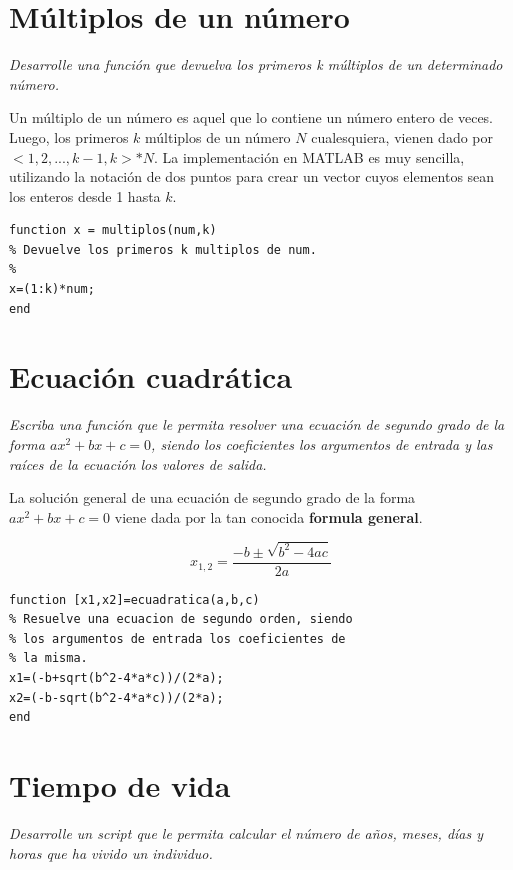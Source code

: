 \section{Múltiplos de un número}

\textit{Desarrolle una función que devuelva los primeros k múltiplos de un determinado número.}



Un múltiplo de un número es aquel que lo contiene un número entero de veces. Luego, los primeros $k$ 
múltiplos de un número $N$ cualesquiera, vienen dado por $<1,2,...,k-1,k>*N$. La implementación 
en MATLAB es muy sencilla, utilizando la notación de dos puntos para crear un vector cuyos elementos 
sean los enteros desde 1 hasta $k$.

\begin{verbatim}
function x = multiplos(num,k)
% Devuelve los primeros k multiplos de num.
%
x=(1:k)*num;
end
\end{verbatim}


\section{Ecuación cuadrática}

\textit{Escriba una función que le permita resolver una ecuación de segundo grado de la forma 
$ax^2+bx+c=0$, siendo los coeficientes los argumentos de entrada y las raíces de la ecuación los valores de salida.}



La solución general de una ecuación de segundo grado de la forma $ax^2+bx+c=0$ viene dada por la tan conocida 
{\bf formula general}.

$$x_{1,2}=\frac{-b\pm\sqrt{b^2-4ac}}{2a}$$

\begin{verbatim}
function [x1,x2]=ecuadratica(a,b,c)
% Resuelve una ecuacion de segundo orden, siendo
% los argumentos de entrada los coeficientes de
% la misma.
x1=(-b+sqrt(b^2-4*a*c))/(2*a);
x2=(-b-sqrt(b^2-4*a*c))/(2*a);
end
\end{verbatim}


\section{Tiempo de vida}

\textit{Desarrolle un script que le permita calcular el número de años, meses, días y horas que ha vivido un individuo.}



